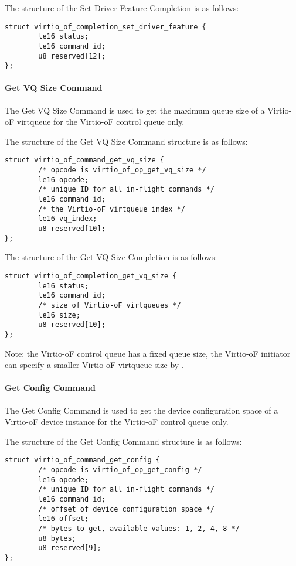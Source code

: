 The structure of the Set Driver Feature Completion is as follows:
\begin{lstlisting}
struct virtio_of_completion_set_driver_feature {
        le16 status;
        le16 command_id;
        u8 reserved[12];
};
\end{lstlisting}

\paragraph{Get VQ Size Command}\label{sec:Virtio Transport Options / Virtio Over Fabrics / Commands Definition / Opcodes / Get VQ Size Command}
The Get VQ Size Command is used to get the maximum queue size of a Virtio-oF virtqueue for the Virtio-oF control queue only.

The structure of the Get VQ Size Command structure is as follows:
\begin{lstlisting}
struct virtio_of_command_get_vq_size {
        /* opcode is virtio_of_op_get_vq_size */
        le16 opcode;
        /* unique ID for all in-flight commands */
        le16 command_id;
        /* the Virtio-oF virtqueue index */
        le16 vq_index;
        u8 reserved[10];
};
\end{lstlisting}

The structure of the Get VQ Size Completion is as follows:
\begin{lstlisting}
struct virtio_of_completion_get_vq_size {
        le16 status;
        le16 command_id;
        /* size of Virtio-oF virtqueues */
        le16 size;
        u8 reserved[10];
};
\end{lstlisting}

Note: the Virtio-oF control queue has a fixed queue size, the Virtio-oF initiator can specify a smaller Virtio-oF virtqueue size by
.

\paragraph{Get Config Command}\label{sec:Virtio Transport Options / Virtio Over Fabrics / Commands Definition / Opcodes / Get Config Command}
The Get Config Command is used to get the device configuration space of a Virtio-oF device instance for the Virtio-oF control queue only.

The structure of the Get Config Command structure is as follows:
\begin{lstlisting}
struct virtio_of_command_get_config {
        /* opcode is virtio_of_op_get_config */
        le16 opcode;
        /* unique ID for all in-flight commands */
        le16 command_id;
        /* offset of device configuration space */
        le16 offset;
        /* bytes to get, available values: 1, 2, 4, 8 */
        u8 bytes;
        u8 reserved[9];
};
\end{lstlisting}

